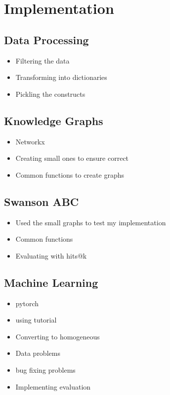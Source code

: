 \documentclass{l4proj}
\begin{document}
\chapter{Implementation}
\section{Data Processing}
\begin{itemize}
    \item Filtering the data
    \item Transforming into dictionaries
    \item Pickling the constructs
\end{itemize}
\section{Knowledge Graphs}
\begin{itemize}
    \item Networkx
    \item Creating small ones to ensure correct
    \item Common functions to create graphs
\end{itemize}
\section{Swanson ABC}
\begin{itemize}
    \item Used the small graphs to test my implementation
    \item Common functions
    \item Evaluating with hits@k
\end{itemize}
\section{Machine Learning}
\begin{itemize}
    \item pytorch
    \item using tutorial
    \item Converting to homogeneous
    \item Data problems
    \item bug fixing problems
    \item Implementing evaluation
\end{itemize}
\end{document}
